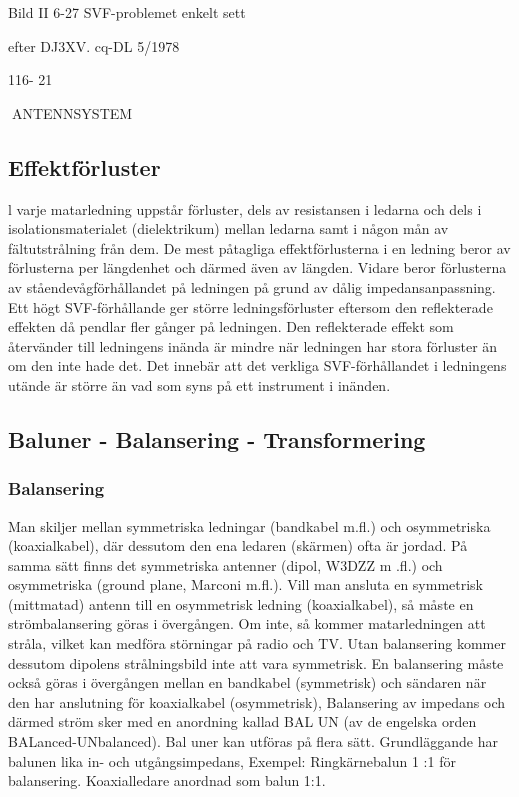 {{Bild II 6-27 SVF-problemet enkelt sett

efter DJ3XV. cq-DL 5/1978

116- 21

ANTENNSYSTEM
\subsection{Effektförluster}

l varje matarledning uppstår förluster, dels
av resistansen i ledarna och dels i isolationsmaterialet (dielektrikum) mellan ledarna samt i någon mån av fältutstrålning från
dem. De mest påtagliga effektförlusterna i
en ledning beror av förlusterna per längdenhet och därmed även av längden. Vidare
beror förlusterna av ståendevågförhållandet på ledningen på grund av dålig impedansanpassning.
Ett högt SVF-förhållande ger större ledningsförluster eftersom den reflekterade effekten då pendlar fler gånger på ledningen.
Den reflekterade effekt som återvänder till
ledningens inända är mindre när ledningen
har stora förluster än om den inte hade det.
Det innebär att det verkliga SVF-förhållandet i ledningens utände är större än vad som
syns på ett instrument i inänden.

\subsection{Baluner - Balansering - Transformering}

\subsubsection{Balansering}

Man skiljer mellan symmetriska ledningar
(bandkabel m.fl.) och osymmetriska (koaxialkabel), där dessutom den ena ledaren (skärmen) ofta är jordad.
På samma sätt finns det symmetriska
antenner (dipol, W3DZZ m .fl.) och osymmetriska (ground plane, Marconi m.fl.).
Vill man ansluta en symmetrisk (mittmatad) antenn till en osymmetrisk ledning
(koaxialkabel), så måste en strömbalansering göras i övergången. Om inte, så kommer matarledningen att stråla, vilket kan
medföra störningar på radio och TV. Utan
balansering kommer dessutom dipolens
strålningsbild inte att vara symmetrisk.
En balansering måste också göras i övergången mellan en bandkabel (symmetrisk)
och sändaren när den har anslutning för
koaxialkabel (osymmetrisk),
Balansering av impedans och därmed
ström sker med en anordning kallad BAL UN
(av de engelska orden BALanced-UNbalanced).
Bal uner kan utföras på flera sätt. Grundläggande har balunen lika in- och utgångsimpedans,
Exempel:
Ringkärnebalun 1 :1 för balansering.
Koaxialledare anordnad som balun 1:1.

}}
